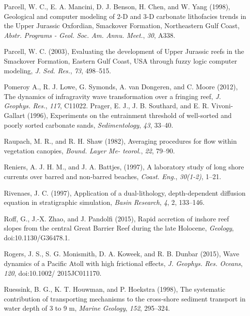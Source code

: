 \documentclass[default,jgrga]{agutex2015}
\begin{document}
\begin{article}
\begin{thebibliography}{}
Parcell, W. C., E. A. Mancini, D. J. Benson, H. Chen, and W. Yang (1998), Geological and computer modeling of 2-D and 3-D carbonate lithofacies trends in the Upper Jurassic Oxfordian, Smackover Formation, Northeastern Gulf Coast, \textit{Abstr. Programs - Geol. Soc. Am. Annu. Meet.}, \textit{30}, A338.

Parcell, W. C. (2003), Evaluating the development of Upper Jurassic reefs in the Smackover Formation, Eastern Gulf Coast, USA through fuzzy logic computer modeling, \textit{J. Sed. Res.}, \textit{73}, 498--515.

Pomeroy A., R. J. Lowe, G. Symonds, A. van Dongeren,  and C. Moore (2012), The dynamics of infragravity wave transformation over a fringing reef, \textit{J. Geophys. Res.}, \textit{117}, C11022.
Prager, E. J., J. B. Southard, and E. R. Vivoni-Gallart (1996), Experiments on the entrainment threshold of well-sorted and poorly sorted carbonate sands, \textit{Sedimentology}, \textit{43}, 33--40.

Raupach, M. R., and R. H. Shaw (1982), Averaging procedures for flow within vegetation canopies, \textit{Bound. Layer Me-
teorol.}, \textit{22}, 79--90.

Reniers, A. J. H. M., and J. A. Battjes, (1997), A laboratory study of long shore currents over barred and non-barred beaches,  \textit{Coast. Eng.}, \textit{30(1-2)}, 1--21.

Rivenaes, J. C. (1997), Application of a dual-lithology, depth-dependent diffusion equation in stratigraphic simulation, \textit{Basin Research}, \textit{4}, 2, 133--146.

Roff, G., J.-X. Zhao, and J. Pandolfi (2015), Rapid accretion of inshore reef slopes from the central Great Barrier Reef during the late Holocene, \textit{Geology}, doi:10.1130/G36478.1.

Rogers, J. S., S. G. Monismith, D. A. Koweek, and R. B. Dunbar (2015), Wave dynamics of a Pacific Atoll with high frictional effects, \textit{J. Geophys. Res. Oceans}, \textit{120}, doi:10.1002/ 2015JC011170.

Ruessink, B. G., K. T. Houwman, and P. Hoekstra (1998), The systematic contribution of transporting mechanisms to the cross-shore sediment transport in water depth of 3 to 9 m, \textit{Marine Geology}, \textit{152}, 295--324.


\end{thebibliography}
\end{article}
\end{document}
